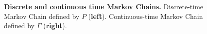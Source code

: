 \begin{figure}[h]
	\centering
	\caption[Discrete and continuous time Markov Chains.]{\textbf{Discrete and continuous time Markov Chains.} Discrete-time Markov Chain defined by $P$ (\textbf{left}). Continuous-time Markov Chain defined by $\Gamma$ (\textbf{right}).}
	\label{fig:mc-diagrams}
\end{figure}

